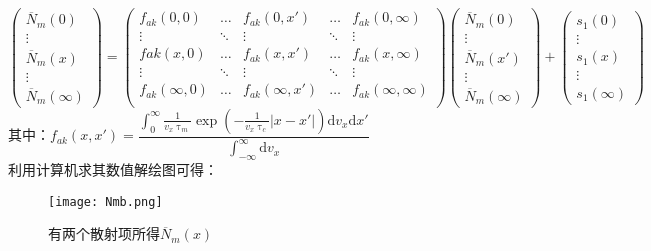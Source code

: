 \documentclass{article}
\begin{document}
	\begin{equation}\label{eq:8}
		\begin{pmatrix}
			\overline{N}_m(0)\\ \vdots\\ \overline{N}_m(x)\\ \vdots \\ \overline{N}_m(\infty)
		\end{pmatrix}
		=
		\begin{pmatrix}
			f_{ak}(0,0)&\dots&f_{ak}(0,x')&\dots&f_{ak}(0,\infty)\\
			\vdots&\ddots&\vdots&\ddots&\vdots\\
			f{ak}(x,0)&\dots&f_{ak}(x,x')&\dots&f_{ak}(x,\infty)\\
			\vdots&\ddots&\vdots&\ddots&\vdots\\
			f_{ak}(\infty,0)&\dots&f_{ak}(\infty,x')&\dots&f_{ak}(\infty,\infty)\\
		\end{pmatrix}
		\begin{pmatrix}
			\overline{N}_m(0)\\ \vdots\\ \overline{N}_m(x')\\ \vdots \\ \overline{N}_m(\infty)
		\end{pmatrix}
		+
		\begin{pmatrix}
			s_1(0)\\ \vdots\\s_1(x)\\ \vdots\\s_1(\infty)
		\end{pmatrix}
	\end{equation}
	其中：$f_{ak}(x,x')=\dfrac{\displaystyle\int_0^{\infty}\frac{1}{v_x\uptau_m}\exp(-\frac{1}{v_x\uptau_c}|x-x'|)\mathrm{d}v_x\mathrm{d}x'}{\displaystyle\int_{-\infty}^{\infty}\mathrm{d}v_x}$\\[0.7cm]
	利用计算机求其数值解绘图可得：
		\begin{figure}[ht]
	\centering
	\texttt{[image: Nmb.png]}
	\caption{有两个散射项所得$\overline{N}_m(x)$}
	\label{fg:1}
	\end{figure}
\end{document}
